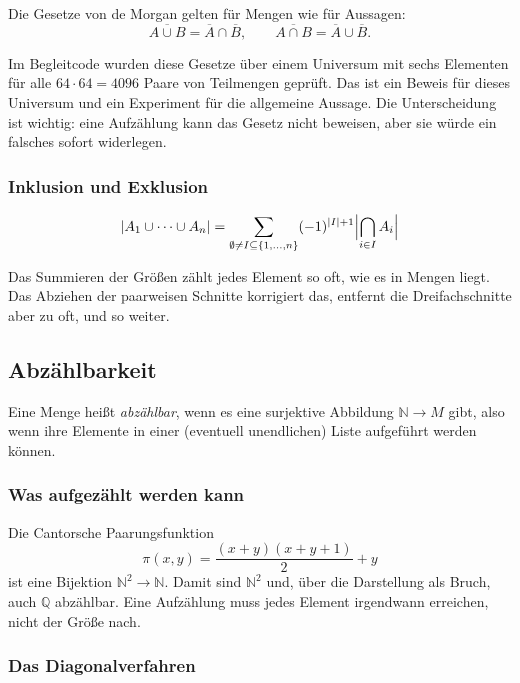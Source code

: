 \documentclass[12pt, a4paper]{article}
\begin{document}
Die Gesetze von de Morgan gelten für Mengen wie für Aussagen:
\[
  \overline{A \cup B} = \overline{A} \cap \overline{B}, \qquad
  \overline{A \cap B} = \overline{A} \cup \overline{B}.
\]

\begin{notebox}
Im Begleitcode wurden diese Gesetze über einem Universum mit sechs Elementen
für alle $64 \cdot 64 = 4096$ Paare von Teilmengen geprüft. Das ist ein
Beweis für dieses Universum und ein Experiment für die allgemeine Aussage.
Die Unterscheidung ist wichtig: eine Aufzählung kann das Gesetz nicht
beweisen, aber sie würde ein falsches sofort widerlegen.
\end{notebox}

\subsubsection{Inklusion und Exklusion}

\[
  |A_1 \cup \dots \cup A_n| =
  \sum_{\emptyset \neq I \subseteq \{1,\dots,n\}} (-1)^{|I|+1}
  \Bigl| \bigcap_{i \in I} A_i \Bigr|
\]

Das Summieren der Größen zählt jedes Element so oft, wie es in Mengen liegt.
Das Abziehen der paarweisen Schnitte korrigiert das, entfernt die
Dreifachschnitte aber zu oft, und so weiter.

\subsection{Abzählbarkeit}

\begin{definitionbox}
Eine Menge heißt \emph{abzählbar}, wenn es eine surjektive Abbildung
$\mathbb{N} \to M$ gibt, also wenn ihre Elemente in einer (eventuell
unendlichen) Liste aufgeführt werden können.
\end{definitionbox}

\subsubsection{Was aufgezählt werden kann}

Die Cantorsche Paarungsfunktion
\[
  \pi(x, y) = \frac{(x+y)(x+y+1)}{2} + y
\]
ist eine Bijektion $\mathbb{N}^2 \to \mathbb{N}$. Damit sind $\mathbb{N}^2$
und, über die Darstellung als Bruch, auch $\mathbb{Q}$ abzählbar. Eine
Aufzählung muss jedes Element irgendwann erreichen, nicht der Größe nach.

\subsubsection{Das Diagonalverfahren}
\end{document}
